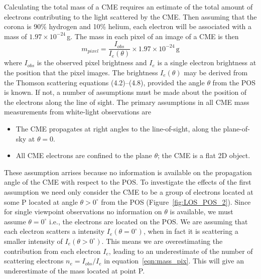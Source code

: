 %
%
%
Calculating the total mass of a CME requires an estimate of the total amount of electrons contributing to the light scattered by the CME. Then assuming that the corona is 90\% hydrogen and 10\% helium, each electron will be associated with a mass of $1.97\times10^{-24}$\,g. The mass in each pixel of an image of a CME is then
\begin{equation}
m_{pixel}=\frac{I_{obs}}{I_e(\theta)} \times1.97\times10^{-24}\,\mathrm{g}
\label{eqn:mass_pix}
\end{equation}
where $I_{obs}$ is the observed pixel brightness and $I_e$ is a single electron brightness at the position that the pixel images.
The brightness $I_e(\theta)$ may be derived from the Thomson scattering equations (4.2)--(4.8), provided the angle $\theta$ from the POS is known. If not, a number of assumptions must be made about the position of the electrons along the line of sight. The primary assumptions in all CME mass measurements from white-light observations are
%
%
\begin{itemize}
\item The CME propagates at right angles to the line-of-sight, along the plane-of-sky at $\theta=0$.
\item All CME electrons are confined to the plane $\theta$; the CME is a flat 2D object.
\end{itemize}
These assumption arrises because no information is available on the propagation angle of the CME with respect to the POS. 
To investigate the effects of the first assumption we need only consider the CME to be a group of electrons located at some P located at angle $\theta >0^{\circ}$ from the POS (Figure~\ref{fig:LOS_POS_2}). Since for single viewpoint observations no information on $\theta$ is available, we must assume $\theta=0^{\circ}$ i.e., the electrons are located on the POS. We are assuming that each electron scatters a intensity $I_e(\theta=0^{\circ})$, when in fact it is scattering a smaller intensity of $I_e(\theta>0^{\circ})$. This means we are overestimating the contribution from each electron $I_e$, leading to an underestimate of the number of scattering electrons $n_e = I_{obs}/I_e$ in equation~\ref{eqn:mass_pix}. This will give an underestimate of the mass located at point P. 


